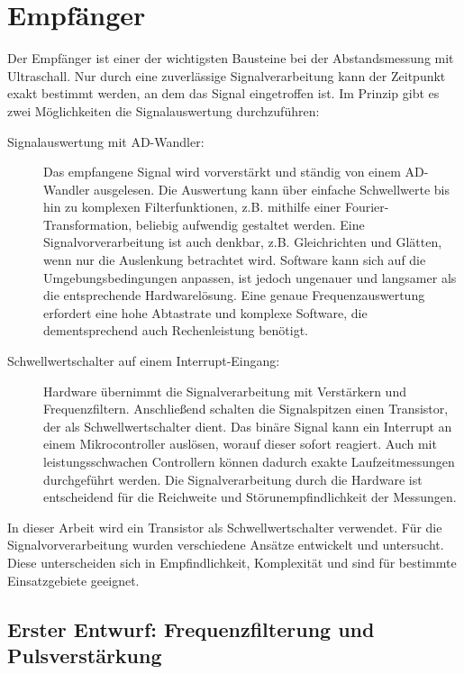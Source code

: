 \section{Empfänger}
Der Empfänger ist einer der wichtigsten Bausteine bei der Abstandsmessung mit Ultraschall. Nur durch eine zuverlässige Signalverarbeitung kann der Zeitpunkt exakt bestimmt werden, an dem das Signal eingetroffen ist. Im Prinzip gibt es zwei Möglichkeiten die Signalauswertung durchzuführen:
\begin{description} %
	\item[Signalauswertung mit AD-Wandler:] Das empfangene Signal wird vorverstärkt und ständig von einem AD-Wandler ausgelesen. Die Auswertung kann über einfache Schwellwerte bis hin zu komplexen Filterfunktionen, z.B. mithilfe einer Fourier-Transformation, beliebig aufwendig gestaltet werden. Eine Signalvorverarbeitung ist auch denkbar, z.B. Gleichrichten und Glätten, wenn nur die Auslenkung betrachtet wird. Software kann sich auf die Umgebungsbedingungen anpassen, ist jedoch ungenauer und langsamer als die entsprechende Hardwarelösung. Eine genaue Frequenzauswertung erfordert eine hohe Abtastrate und komplexe Software, die dementsprechend auch Rechenleistung benötigt.
	\item[Schwellwertschalter auf einem Interrupt-Eingang:] Hardware übernimmt die Signalverarbeitung mit Verstärkern und Frequenzfiltern. Anschließend schalten die Signalspitzen einen Transistor, der als Schwellwertschalter dient. Das binäre Signal kann ein Interrupt an einem Mikrocontroller auslösen, worauf dieser sofort reagiert. Auch mit leistungsschwachen Controllern können dadurch exakte Laufzeitmessungen durchgeführt werden. Die Signalverarbeitung durch die Hardware ist entscheidend für die Reichweite und Störunempfindlichkeit der Messungen.
\end{description}
In dieser Arbeit wird ein Transistor als Schwellwertschalter verwendet. Für die Signalvorverarbeitung wurden verschiedene Ansätze entwickelt und untersucht. Diese unterscheiden sich in Empfindlichkeit, Komplexität und sind für bestimmte Einsatzgebiete geeignet.



\subsection{Erster Entwurf: Frequenzfilterung und Pulsverstärkung}

